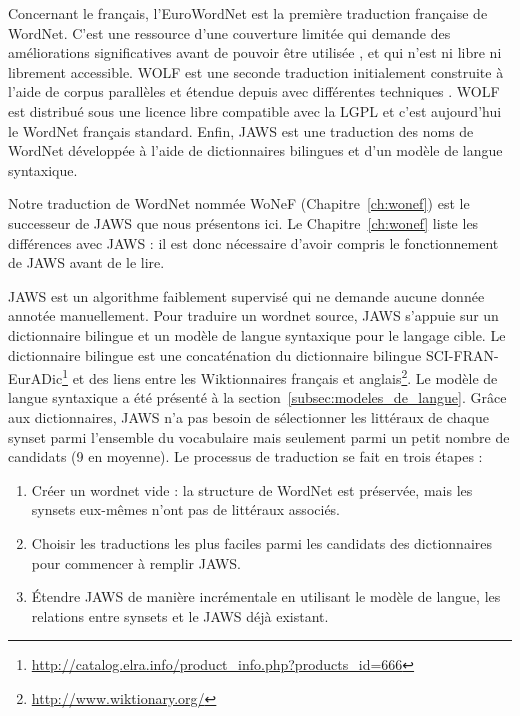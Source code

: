 Concernant le français, l'EuroWordNet \citep{vossen1998eurowordnet} est la
première traduction française de WordNet. C'est une ressource d'une couverture
limitée qui demande des améliorations significatives avant de pouvoir être
utilisée \citep{jacquin2006systemes}, et qui n'est ni libre ni librement
accessible. WOLF est une seconde traduction initialement construite à l'aide de
corpus parallèles \citep{sagot2008construction} et étendue depuis avec
différentes techniques \citep{apidianaki2012applying}. WOLF est distribué sous
une licence libre compatible avec la LGPL et c'est aujourd'hui le WordNet
français standard. Enfin, JAWS \citep{mouton2010jaws} est une traduction des
noms de WordNet développée à l'aide de dictionnaires bilingues et d'un modèle
de langue syntaxique.

\label{subsec:jaws_translation_process}

Notre traduction de WordNet nommée WoNeF (Chapitre~\ref{ch:wonef}) est le
successeur de JAWS \citep{mouton2010jaws,mouton2010phd} que nous présentons
ici. Le Chapitre~\ref{ch:wonef} liste les différences avec JAWS : il est donc
nécessaire d'avoir compris le fonctionnement de JAWS avant de le lire.

JAWS est un algorithme faiblement supervisé qui ne demande aucune donnée
annotée manuellement. Pour traduire un wordnet source, JAWS s'appuie sur un
dictionnaire bilingue et un modèle de langue syntaxique pour le langage cible.
Le dictionnaire bilingue est une concaténation du dictionnaire bilingue
SCI-FRAN-EurADic\footnote{\url{http://catalog.elra.info/product_info.php?products_id=666}}
et des liens entre les Wiktionnaires français et
anglais\footnote{\url{http://www.wiktionary.org/}}. Le modèle de langue
syntaxique a été présenté à la section~\ref{subsec:modeles_de_langue}. Grâce
aux dictionnaires, JAWS n'a pas besoin de sélectionner les littéraux de chaque
synset parmi l'ensemble du vocabulaire mais seulement parmi un petit nombre de
candidats (9 en moyenne).  Le processus de traduction se fait en trois étapes :

\begin{enumerate}
    
    \item Créer un wordnet vide : la structure de WordNet est préservée, mais
        les synsets eux-mêmes n'ont pas de littéraux associés.

    \item Choisir les traductions les plus faciles parmi les candidats des
    dictionnaires pour commencer à remplir JAWS.

    \item Étendre JAWS de manière incrémentale en utilisant le modèle de
        langue, les relations entre synsets et le JAWS déjà existant.

\end{enumerate}

